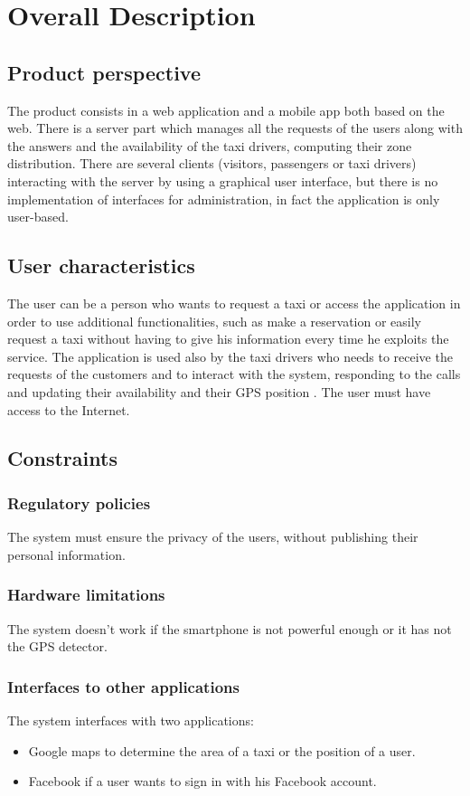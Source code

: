 \documentclass[18pt,oneside,a4paper, titlepage]{article}
\begin{document}
\newpage
\section{Overall Description}
	\subsection{Product perspective}
	The product consists in a web application and a mobile app both based on the web. There is a server part which manages all the requests of the users along with the answers and the availability of the taxi drivers, computing their zone distribution. There are several clients (visitors, passengers or taxi drivers) interacting with the server by using a graphical user interface, but there is no implementation of interfaces for administration, in fact the application is only user-based.
	
	\subsection{User characteristics}
	The user can be a person who wants to request a taxi or access the application in order to use additional functionalities, such as make a reservation or easily request a taxi without having to give his information every time he exploits the service.
	The application is used also by the taxi drivers who needs to receive the requests of the customers and to interact with the system, responding to the calls and updating their availability and their GPS position .
	The user must have access to the Internet.
	
	\subsection{Constraints}
		\subsubsection{Regulatory policies}
		The system must ensure the privacy of the users, without publishing their personal information. 
		\subsubsection{Hardware limitations}
		The system doesn't work if the smartphone is not powerful enough or it has not the GPS detector.
		\subsubsection{Interfaces to other applications}
		The system interfaces with two applications:
		\begin{itemize}
			\item Google maps to determine the area of a taxi or the position of a user.
			\item Facebook if a user wants to sign in with his Facebook account.
		\end{itemize}
\end{document}
